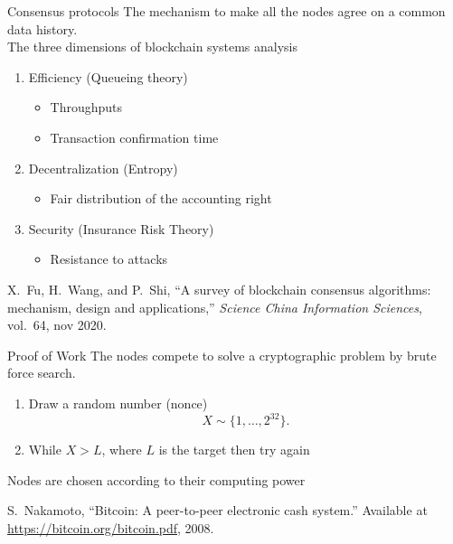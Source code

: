 \documentclass{beamer}
\begin{document}
\begin{frame}{Consensus protocols}
The mechanism to make all the nodes agree on a common data history.\\
\vspace{0.3cm}
The three dimensions of blockchain systems analysis
\begin{enumerate}
  \item Efficiency (Queueing theory)
  \begin{itemize}
    \item Throughputs
    \item Transaction confirmation time
  \end{itemize}
  \item Decentralization (Entropy)
  \begin{itemize}
    \item Fair distribution of the accounting right
  \end{itemize}
  \item Security (Insurance Risk Theory)
  \begin{itemize}
    \item Resistance to attacks
  \end{itemize}
\end{enumerate}
\footnotesize
\begin{thebibliography}{1}
X.~Fu, H.~Wang, and P.~Shi, ``A survey of blockchain consensus algorithms:
  mechanism, design and applications,'' {\em Science China Information
  Sciences}, vol.~64, nov 2020.
\end{thebibliography}

\end{frame}
\begin{frame}{Proof of Work}
The nodes compete to solve a cryptographic problem by brute force search.
\begin{tcolorbox}[enhanced,drop shadow, title=PoW]
\begin{enumerate}
    \item Draw a random number (nonce)
    \[
    X\sim\{1,\ldots, 2^{32}\}.
    \]
    \item While $X > L$, where $L$ is the target then try again  
\end{enumerate}
\end{tcolorbox}
\vspace{0.3cm}
Nodes are chosen according to their computing power
{\footnotesize
\begin{thebibliography}{1}
S.~Nakamoto, ``Bitcoin: A peer-to-peer electronic cash system.'' Available at
  \href{https://bitcoin.org/bitcoin.pdf}{https://bitcoin.org/bitcoin.pdf},
  2008.
\end{thebibliography}  
}
\end{frame}
\end{document}
